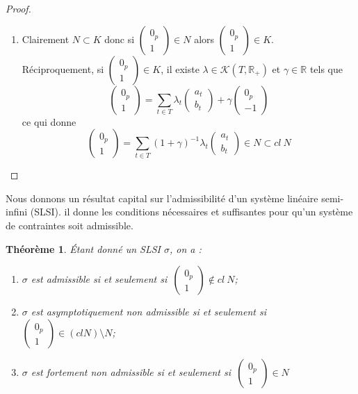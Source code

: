 \documentclass[11pt]{report}
\newenvironment{boxtheorem}
{\begin{tcolorbox}
		[enhanced jigsaw,breakable,pad at break*=2mm,
		colback=black!5,colframe=bleueLeger]}
	{\end{tcolorbox}}
\theoremstyle{styletheorem}
\newtheorem{theoreme}{Théorème}[section]
\newenvironment{theorem}
{\vspace*{0.3cm}\begin{boxtheorem}\begin{theoreme}}{\end{theoreme}\end{boxtheorem}\vspace*{0.3cm}}
\theoremstyle{styledef}
\theoremstyle{remark}
\newcommand{\ssi}{si et seulement si\  }
\newcommand{\R}{\ensuremath{\mathbb{R}}}
\begin{document}
\begin{proof}
	\begin{enumerate}[label = (\roman*)]\ \\
		\item Clairement $N \subset K$ donc si $\begin{pmatrix}
			0_p\\ 1
		\end{pmatrix}\in N$ alors $\begin{pmatrix}
			0_p\\ 1
		\end{pmatrix}\in K$.\\
		Réciproquement, si $\begin{pmatrix}
			0_p\\ 1
		\end{pmatrix}\in K$, il existe $\lambda \in \mathcal{K}(T,\R_+)$ et $\gamma \in \R$ tels que $$\begin{pmatrix}
			0_p\\ 1
		\end{pmatrix} = \sum_{t \in T} \lambda_t \begin{pmatrix}
			a_t\\ b_t\end{pmatrix} +  \gamma \begin{pmatrix}
			0_p\\ -1
		\end{pmatrix}$$
		ce qui donne
		$$\begin{pmatrix}
			0_p\\ 1
		\end{pmatrix} = \sum_{t \in T} (1+\gamma)^{-1}\lambda_t \begin{pmatrix}
			a_t\\ b_t\end{pmatrix} \in N \subset cl\ N$$
		
		
		
		
	\end{enumerate}
\end{proof}
Nous donnons un résultat capital sur l'admissibilité d'un système linéaire semi-infini (SLSI). il donne les conditions nécessaires et suffisantes pour qu'un système de contraintes soit admissible.
\begin{theorem}\label{th21}
	Étant donné un SLSI $\sigma$, on a :
	\begin{enumerate}[label = (\roman*)]
		\item $\sigma$ est admissible \ssi $\begin{pmatrix}
			0_p\\ 1
		\end{pmatrix} \notin cl\ N$;
		\item $\sigma$ est asymptotiquement non admissible \ssi $\begin{pmatrix}
			0_p\\ 1
		\end{pmatrix} \in (cl N)\setminus N$;
		\item $\sigma$ est fortement non admissible \ssi $\begin{pmatrix}
			0_p\\ 1
		\end{pmatrix} \in N$
	\end{enumerate}
\end{theorem}
\end{document}
